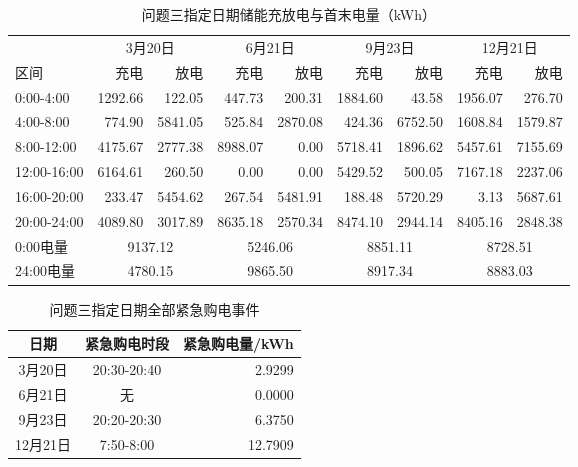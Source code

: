 \begin{table}[htbp]\centering
\caption{问题三指定日期储能充放电与首末电量（kWh）}\label{tab:q3soc}
\footnotesize
\setlength{\tabcolsep}{4pt}
\begin{tabular}{lrrrrrrrr}
\toprule
 & \multicolumn{2}{c}{3月20日} & \multicolumn{2}{c}{6月21日} & \multicolumn{2}{c}{9月23日} & \multicolumn{2}{c}{12月21日}\\
区间 & 充电 & 放电 & 充电 & 放电 & 充电 & 放电 & 充电 & 放电 \\
\midrule
0:00-4:00 & 1292.66 & 122.05 & 447.73 & 200.31 & 1884.60 & 43.58 & 1956.07 & 276.70 \\
4:00-8:00 & 774.90 & 5841.05 & 525.84 & 2870.08 & 424.36 & 6752.50 & 1608.84 & 1579.87 \\
8:00-12:00 & 4175.67 & 2777.38 & 8988.07 & 0.00 & 5718.41 & 1896.62 & 5457.61 & 7155.69 \\
12:00-16:00 & 6164.61 & 260.50 & 0.00 & 0.00 & 5429.52 & 500.05 & 7167.18 & 2237.06 \\
16:00-20:00 & 233.47 & 5454.62 & 267.54 & 5481.91 & 188.48 & 5720.29 & 3.13 & 5687.61 \\
20:00-24:00 & 4089.80 & 3017.89 & 8635.18 & 2570.34 & 8474.10 & 2944.14 & 8405.16 & 2848.38 \\
0:00电量 & \multicolumn{2}{c}{9137.12} & \multicolumn{2}{c}{5246.06} & \multicolumn{2}{c}{8851.11} & \multicolumn{2}{c}{8728.51} \\
24:00电量 & \multicolumn{2}{c}{4780.15} & \multicolumn{2}{c}{9865.50} & \multicolumn{2}{c}{8917.34} & \multicolumn{2}{c}{8883.03} \\
\bottomrule
\end{tabular}
\end{table}
\begin{table}[htbp]\centering
\caption{问题三指定日期全部紧急购电事件}\label{tab:q3emerg}
\small
\begin{tabular}{ccr}
\toprule
日期 & 紧急购电时段 & 紧急购电量/kWh \\
\midrule
3月20日 & 20:30-20:40 & 2.9299 \\
6月21日 & 无 & 0.0000 \\
9月23日 & 20:20-20:30 & 6.3750 \\
12月21日 & 7:50-8:00 & 12.7909 \\
\bottomrule
\end{tabular}
\end{table}
